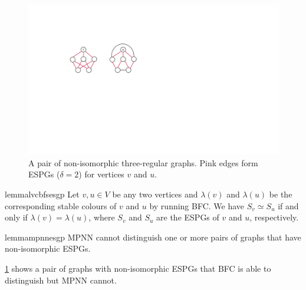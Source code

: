 
\begin{figure}[ht]
\centering
\includegraphics[clip,width=0.65\columnwidth]{figures/lemma2_a_new.pdf}
\caption{A pair of non-isomorphic three-regular graphs. Pink edges form ESPGs ($\delta = 2$) for vertices $v$ and $u$.} 
\label{fig:esgp_examples}
\end{figure}

\begin{restatable}[]{lemma}{lvcbfsesgp}
\label{lemma:lvcbfs_esgp}
Let $v,u \in V$ be any two vertices and $\lambda(v)$ and $\lambda(u)$ be the corresponding stable colours of $v$ and $u$ by running BFC.  We have $S_v\simeq S_u$ if and only if $\lambda(v) = \lambda(u)$, where $S_v$ and $S_u$ are the ESPGs of $v$ and $u$, respectively. 

\end{restatable}

\begin{restatable}[]{lemma}{mpnnesgp}
\label{lemma:mpnn_esgp}
MPNN cannot distinguish one or more pairs of graphs that have non-isomorphic ESPGs.
\end{restatable}
\cref{fig:esgp_examples} shows a pair of graphs with non-isomorphic ESPGs that BFC is able to distinguish but MPNN cannot.



